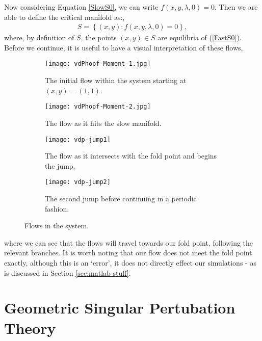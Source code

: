 Now considering Equation \ref{SlowS0}, we can write $f(x,y,\lambda, 0)=0$. Then we are able to define the critical manifold as:,
\begin{align} \label{CriticalS}
S= \left\{ (x,y) : f(x,y,\lambda, 0)=0 \right \},
\end{align}
where, by definition of $S$, the points $(x,y) \in S$ are equilibria of (\ref{FastS0}). Before we continue, it is useful to have a visual interpretation of these flows, 
\begin{figure}[h!]\centering

	\begin{subfigure}[t]{0.45\textwidth}
		\centering
		\texttt{[image: vdPhopf-Moment-1.jpg]}
		\caption{The initial flow within the system starting at $ (x,y)=(1,1) $.} 
	\end{subfigure}
	\hfill
	\begin{subfigure}[t]{0.45\textwidth}
		\centering
		\texttt{[image: vdPhopf-Moment-2.jpg]}
		\caption{The flow as it hits the slow manifold.} 
	\end{subfigure}
	
	\vspace{1cm}
	\begin{subfigure}[t]{0.45\textwidth}
		\centering
		\texttt{[image: vdp-jump1]}
		\caption{The flow as it intersects with the fold point and begins the jump.} 
	\end{subfigure}
	\hfill
	\begin{subfigure}[t]{0.45\textwidth}\centering
		\texttt{[image: vdp-jump2]}
		\caption{The second jump before continuing in a periodic fashion.}
	\end{subfigure}
	\caption{Flows in the \vdp system.}
	\label{fig: vdp flow diagram}
\end{figure}\newline
where we can see that the flows will travel towards our fold point, following the relevant branches. It is worth noting that our flow does not meet the fold point exactly, although this is an `error', it does not directly effect our simulations - as is discussed in Section \ref{sec:matlab-stuff}.


\section{Geometric Singular Pertubation Theory} \label{GSPT}


